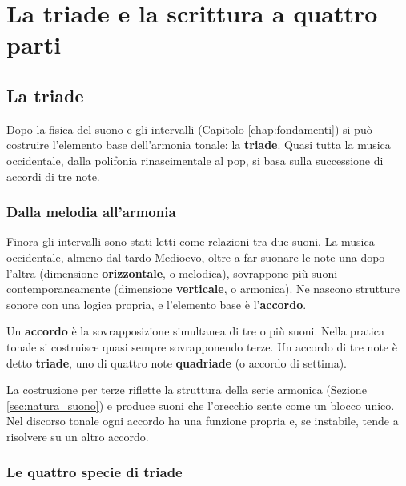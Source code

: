 \part{La triade e la scrittura a quattro parti}

\chapter{La triade}
\label{chap:triadi}

Dopo la fisica del suono e gli intervalli (Capitolo \ref{chap:fondamenti}) si può costruire l'elemento base dell'armonia tonale: la \textbf{triade}. Quasi tutta la musica occidentale, dalla polifonia rinascimentale al pop, si basa sulla successione di accordi di tre note.

\section{Dalla melodia all'armonia}
\label{sec:melodia_armonia}

Finora gli intervalli sono stati letti come relazioni tra due suoni. La musica occidentale, almeno dal tardo Medioevo, oltre a far suonare le note una dopo l'altra (dimensione \textbf{orizzontale}, o melodica), sovrappone più suoni contemporaneamente (dimensione \textbf{verticale}, o armonica). Ne nascono strutture sonore con una logica propria, e l'elemento base è l'\textbf{accordo}.

\begin{definizione}[Accordo]
	\label{def:accordo}
	Un \textbf{accordo} è la sovrapposizione simultanea di tre o più suoni. Nella pratica tonale si costruisce quasi sempre sovrapponendo terze. Un accordo di tre note è detto \textbf{triade}, uno di quattro note \textbf{quadriade} (o accordo di settima).
\end{definizione}

La costruzione per terze riflette la struttura della serie armonica (Sezione \ref{sec:natura_suono}) e produce suoni che l'orecchio sente come un blocco unico. Nel discorso tonale ogni accordo ha una funzione propria e, se instabile, tende a risolvere su un altro accordo.

\section{Le quattro specie di triade}
\label{sec:costruzione_triade}


